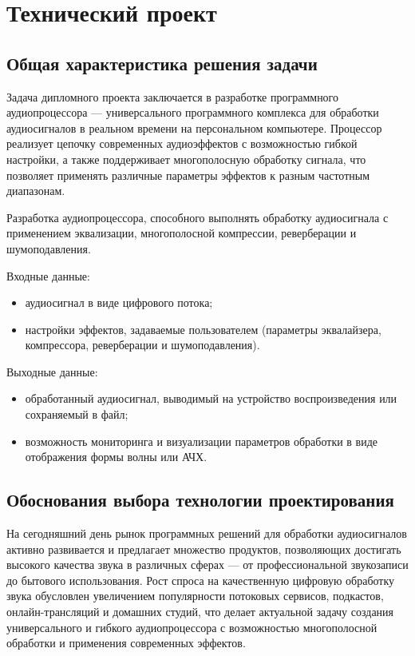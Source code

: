 \section{Технический проект}

\subsection{Общая характеристика решения задачи}

Задача дипломного проекта заключается в разработке программного аудиопроцессора — универсального программного комплекса для обработки аудиосигналов в реальном времени на персональном компьютере. Процессор реализует цепочку современных аудиоэффектов с возможностью гибкой настройки, а также поддерживает многополосную обработку сигнала, что позволяет применять различные параметры эффектов к разным частотным диапазонам.

Разработка аудиопроцессора, способного выполнять обработку аудиосигнала с применением эквализации, многополосной компрессии, реверберации и шумоподавления.

Входные данные:
\begin{itemize}
	\item аудиосигнал в виде цифрового потока; 
	\item настройки эффектов, задаваемые пользователем (параметры эквалайзера, компрессора, реверберации и шумоподавления).
\end{itemize}

Выходные данные:
\begin{itemize}
	\item обработанный аудиосигнал, выводимый на устройство воспроизведения или сохраняемый в файл; 
	\item возможность мониторинга и визуализации параметров обработки в виде отображения формы волны или АЧХ.
\end{itemize}

\subsection{Обоснования выбора технологии проектирования}

На сегодняшний день рынок программных решений для обработки аудиосигналов активно развивается и предлагает множество продуктов, позволяющих достигать высокого качества звука в различных сферах — от профессиональной звукозаписи до бытового использования. Рост спроса на качественную цифровую обработку звука обусловлен увеличением популярности потоковых сервисов, подкастов, онлайн-трансляций и домашних студий, что делает актуальной задачу создания универсального и гибкого аудиопроцессора с возможностью многополосной обработки и применения современных эффектов.

